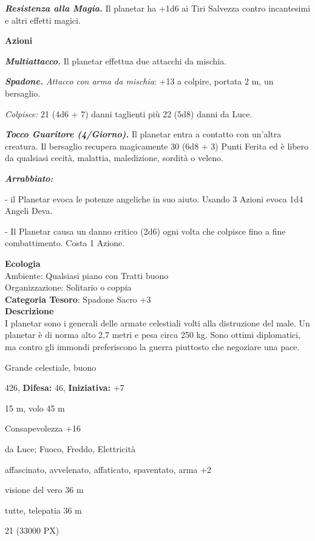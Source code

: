 \begin{multicols}{2}
{\emph{\textbf{Resistenza alla Magia.}} Il planetar ha +1d6 ai Tiri Salvezza contro incantesimi e altri effetti magici.

\textbf{Azioni}

\emph{\textbf{Multiattacco.}} Il planetar effettua due attacchi da mischia.

\emph{\textbf{Spadone.} Attacco con arma da mischia}: +13 a colpire, portata 2 m, un bersaglio.

\emph{Colpisce:} 21 (4d6 + 7) danni taglienti più 22 (5d8) danni da Luce.

\emph{\textbf{Tocco Guaritore (4/Giorno).}} Il planetar entra a contatto con un'altra creatura. Il bersaglio recupera magicamente 30 (6d8 + 3) Punti Ferita ed è libero da qualsiasi cecità, malattia, maledizione, sordità o veleno.

\emph{\textbf{Arrabbiato:}}

- il Planetar evoca le potenze angeliche in suo aiuto. Usando 3 Azioni evoca 1d4 Angeli Deva.

- Il Planetar causa un danno critico (2d6) ogni volta che colpisce fino a fine combattimento. Costa 1 Azione.

\textbf{Ecologia}\\
Ambiente: Qualsiasi piano con Tratti buono\\
Organizzazione: Solitario o coppia\\
\textbf{Categoria Tesoro}: Spadone Sacro +3\\
\textbf{Descrizione}\\
I planetar sono i generali delle armate celestiali volti alla distruzione del male. Un planetar è di norma alto 2,7 metri e pesa circa 250 kg. Sono ottimi diplomatici, ma contro gli immondi preferiscono la guerra piuttosto che negoziare una pace.

\begin{description}[noitemsep, topsep=0pt, parsep=0pt, partopsep=0pt, leftmargin=0cm, labelwidth=2.2cm]
	\item[\textbf{Taglia/Tipo:}] Grande celestiale, buono
	\item[\textbf{Caratt.:}] 
	\item[\textbf{Punti Ferita:}] 426,  \textbf{Difesa:} 46,  \textbf{Iniziativa:} +7
	\item[\textbf{Movimento:}] 15 m, volo 45 m
	\item[\textbf{Tiri Salvez.:}] 
	\item[\textbf{Comp.:}] Consapevolezza +16
	\item[\textbf{Res. Danni:}] da Luce; Fuoco, Freddo, Elettricità
	\item[\textbf{Immunità:}] affascinato, avvelenato, affaticato, spaventato, arma +2
	\item[\textbf{Sensi:}] visione del vero 36 m
	\item[\textbf{Linguaggi:}] tutte, telepatia 36 m
	\item[\textbf{Sfida:}] 21 (33000 PX)\smallskip
\end{description}

}
\end{multicols}
